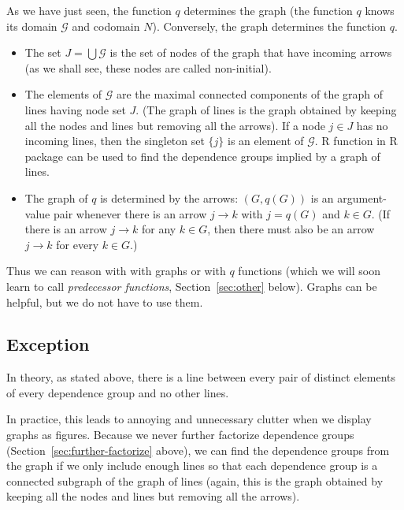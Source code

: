 As we have just seen, the function $q$ determines the graph
(the function $q$ knows its domain $\mathcal{G}$ and codomain $N$).
Conversely, the graph determines the function $q$.
\begin{itemize}
\item The set $J = \bigcup \mathcal{G}$ is the set of nodes of the graph
    that have incoming arrows (as we shall see, these nodes are called
    non-initial).
\item The elements of $\mathcal{G}$ are the maximal connected components
    of the graph of lines having node set $J$.
    (The graph of lines is the graph obtained by keeping all the nodes
    and lines but removing all the arrows).
    If a node $j \in J$ has no incoming lines, then the singleton set $\{j\}$
    is an element of $\mathcal{G}$.
    R function  in R package  \citep{pooh-package}
    can be used to find the dependence groups implied by a graph of lines.
\item The graph of $q$ is determined by the arrows: $(G, q(G))$ is an
    argument-value pair whenever there is an arrow $j \longrightarrow k$
    with $j = q(G)$ and $k \in G$.
    (If there is an arrow $j \longrightarrow k$ for any $k \in G$,
    then there must also be an arrow $j \longrightarrow k$
    for every $k \in G$.)

\end{itemize}

Thus we can reason with with graphs or with $q$ functions (which we will
soon learn to call \emph{predecessor functions}, Section~\ref{sec:other} below).
Graphs can be helpful, but we do not have to use them.

\subsection{Exception}
\label{sec:exception-dependence-group-lines}

In theory, as stated above, there is a line between every pair of distinct
elements of every dependence group and no other lines.

In practice, this leads to annoying and unnecessary clutter
when we display graphs as figures.
Because we never further factorize dependence groups
(Section~\ref{sec:further-factorize} above), we can find the dependence
groups from the graph if we only include enough lines so that each
dependence group is a connected subgraph of the graph of lines
(again, this is the graph obtained by keeping all the nodes and lines but
removing all the arrows).


